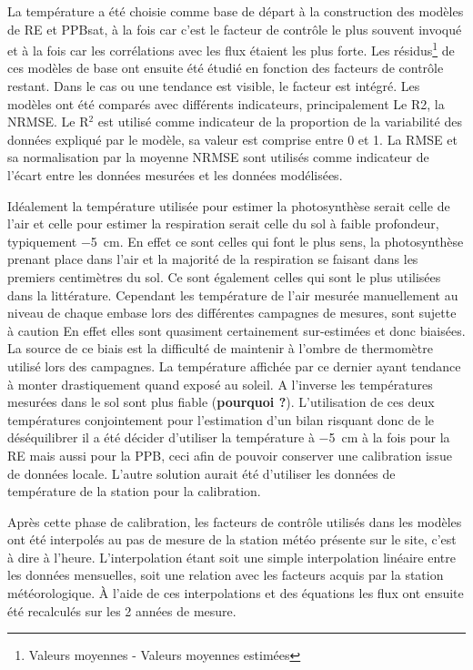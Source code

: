 La température a été choisie comme base de départ à la construction des modèles de RE et PPBsat, à la fois car c'est le facteur de contrôle le plus souvent invoqué et à la fois car les corrélations avec les flux étaient les plus forte.
Les résidus\footnote{Valeurs moyennes - Valeurs moyennes estimées} de ces modèles de base ont ensuite été étudié en fonction des facteurs de contrôle restant.
Dans le cas ou une tendance est visible, le facteur est intégré.
Les modèles ont été comparés avec différents indicateurs, principalement Le R2, la NRMSE.
Le R$^{2}$ est utilisé comme indicateur de la proportion de la variabilité des données expliqué par le modèle, sa valeur est comprise entre 0 et 1.
La RMSE et sa normalisation par la moyenne NRMSE sont utilisés comme indicateur de l'écart entre les données mesurées et les données modélisées.

Idéalement la température utilisée pour estimer la photosynthèse serait celle de l'air et celle pour estimer la respiration serait celle du sol à faible profondeur, typiquement \SI{-5}{\centi\metre}.
En effet ce sont celles qui font le plus sens, la photosynthèse prenant place dans l'air et la majorité de la respiration se faisant dans les premiers centimètres du sol.
Ce sont également celles qui sont le plus utilisées dans la littérature.
Cependant les température de l'air mesurée manuellement au niveau de chaque embase lors des différentes campagnes de mesures, sont sujette à caution 
En effet elles sont quasiment certainement sur-estimées et donc biaisées.
La source de ce biais est la difficulté de maintenir à l'ombre de thermomètre utilisé lors des campagnes.
La température affichée par ce dernier ayant tendance à monter drastiquement quand exposé au soleil.
A l'inverse les températures mesurées dans le sol sont plus fiable (\textbf{pourquoi ?}).
L'utilisation de ces deux températures conjointement pour l'estimation d'un bilan risquant donc de le déséquilibrer il a été décider d'utiliser la température à \SI{-5}{\centi\metre} à la fois pour la RE mais aussi pour la PPB, ceci afin de pouvoir conserver une calibration issue de données locale.
L'autre solution aurait été d'utiliser les données de température de la station pour la calibration.

Après cette phase de calibration, les facteurs de contrôle utilisés dans les modèles ont été interpolés au pas de mesure de la station météo présente sur le site, c'est à dire à l'heure.
L'interpolation étant soit une simple interpolation linéaire entre les données mensuelles, soit une relation avec les facteurs acquis par la station météorologique.
À l'aide de ces interpolations et des équations les flux ont ensuite été recalculés sur les 2 années de mesure.

